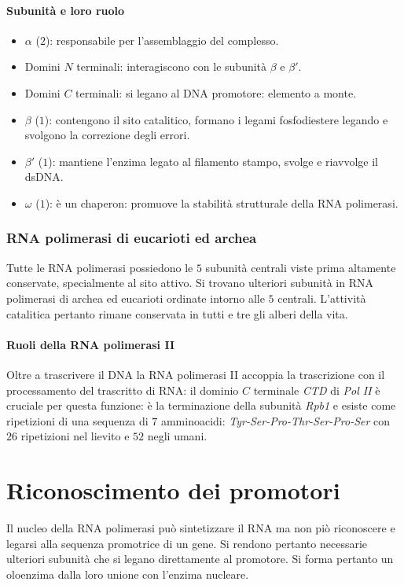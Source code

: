 \paragraph{Subunit\`a e loro ruolo}
\begin{itemize}
	\item $\alpha$ ($2$): responsabile per l'assemblaggio del complesso.
	\item Domini $N$ terminali: interagiscono con le subunit\`a $\beta$ e $\beta'$. 
	\item Domini $C$ terminali: si legano al DNA promotore: elemento a monte.
	\item $\beta$ ($1$): contengono il sito catalitico, formano i legami fosfodiestere legando \emph{} e svolgono la correzione degli errori.
	\item $\beta'$ ($1$): mantiene l'enzima legato al filamento stampo, svolge e riavvolge il dsDNA. 
	\item $\omega$ ($1$): \`e un chaperon: promuove la stabilit\`a strutturale della RNA polimerasi.
\end{itemize}
\subsubsection{RNA polimerasi di eucarioti ed archea}
Tutte le RNA polimerasi possiedono le $5$ subunit\`a centrali viste prima altamente conservate, specialmente al sito attivo. Si trovano ulteriori subunit\`a in RNA polimerasi di archea
ed eucarioti ordinate intorno alle $5$ centrali. L'attivit\`a catalitica pertanto rimane conservata in tutti e tre gli alberi della vita. 
\paragraph{Ruoli della RNA polimerasi II} 
Oltre a trascrivere il DNA la RNA polimerasi II accoppia la trascrizione con il processamento del trascritto di RNA: il dominio $C$ terminale \emph{CTD} di \emph{Pol II} \`e cruciale per 
questa funzione: \`e la terminazione della subunit\`a \emph{Rpb1} e esiste come ripetizioni di una sequenza di $7$ amminoacidi: \emph{Tyr-Ser-Pro-Thr-Ser-Pro-Ser} con $26$ ripetizioni
nel lievito e $52$ negli umani. 	
\section{Riconoscimento dei promotori}
Il nucleo della RNA polimerasi pu\`o sintetizzare il RNA ma non pi\`o riconoscere e legarsi alla sequenza promotrice di un gene. Si rendono pertanto necessarie ulteriori subunit\`a
che si legano direttamente al promotore. Si forma pertanto un oloenzima dalla loro unione con l'enzima nucleare.
